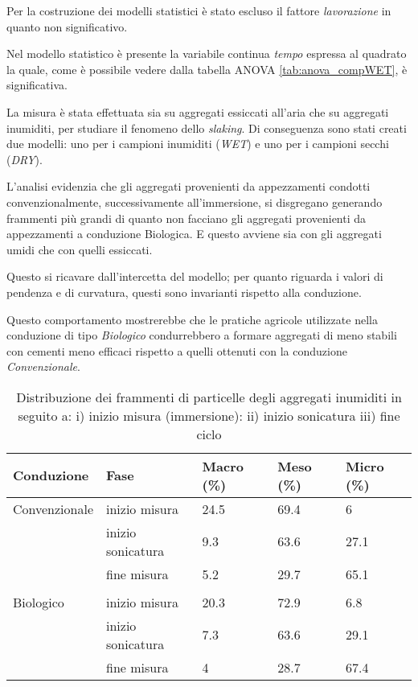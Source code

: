 \documentclass[a4paper]{article}
\begin{document}
Per la costruzione dei modelli statistici \`e stato escluso il fattore
\emph{lavorazione} in quanto non significativo.

Nel modello statistico \`e presente la variabile continua \emph{tempo}
espressa al quadrato la quale, come \`e possibile vedere dalla tabella
ANOVA \ref{tab:anova_compWET}, \`e significativa.

La misura \`e stata effettuata sia su aggregati essiccati all'aria che
su aggregati inumiditi, per studiare il fenomeno dello
\emph{slaking}. Di conseguenza sono stati creati due modelli: uno per
i campioni inumiditi (\emph{WET}) e uno per i campioni secchi
(\emph{DRY}). 

L'analisi evidenzia che gli aggregati provenienti da appezzamenti
condotti convenzionalmente, successivamente all'immersione, si
disgregano generando frammenti pi\`u grandi di quanto non facciano gli
aggregati provenienti da appezzamenti a conduzione Biologica.  E
questo avviene sia con gli aggregati umidi che con quelli essiccati.

Questo si ricavare dall'intercetta del modello; per quanto riguarda i
valori di pendenza e di curvatura, questi sono invarianti rispetto alla
conduzione.

Questo comportamento mostrerebbe che le pratiche agricole utilizzate
nella conduzione di tipo \emph{Biologico} condurrebbero a formare aggregati
di meno stabili con cementi meno efficaci rispetto a quelli ottenuti
con la conduzione \emph{Convenzionale}.




\begin{table}[ht]
\centering
\caption{Distribuzione dei frammenti di particelle degli aggregati inumiditi in seguito a:
i) inizio misura (immersione):
ii) inizio sonicatura
iii) fine ciclo } 
\label{tab:iufw}
\begin{tabular}{lllll}
  \hline
Conduzione & Fase & Macro (\%) & Meso (\%) & Micro (\%) \\ 
  \hline
Convenzionale & inizio misura & 24.5 & 69.4 & 6 \\ 
    & inizio sonicatura & 9.3 & 63.6 & 27.1 \\ 
    & fine misura & 5.2 & 29.7 & 65.1 \\ 
\\ 
  Biologico  & inizio misura & 20.3 & 72.9 & 6.8 \\ 
    & inizio sonicatura & 7.3 & 63.6 & 29.1 \\ 
    & fine misura & 4 & 28.7 & 67.4 \\ 
   \hline
\end{tabular}
\end{table}
\end{document}

